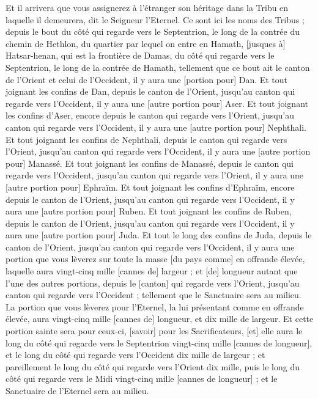 \begin{multicols}{2}
Et il arrivera que vous assignerez à l'étranger son héritage dans la Tribu en laquelle il demeurera, dit le Seigneur l'Eternel.
\VerseOne{}Ce sont ici les noms des Tribus ; depuis le bout du côté qui regarde vers le Septentrion, le long de la contrée du chemin de Hethlon, du quartier par lequel on entre en Hamath, [jusques à] Hatsar-henan, qui est la frontière de Damas, du côté qui regarde vers le Septentrion, le long de la contrée de Hamath, tellement que ce bout ait le canton de l'Orient et celui de l'Occident, il y aura une [portion pour] Dan.
Et tout joignant les confins de Dan, depuis le canton de l'Orient, jusqu'au canton qui regarde vers l'Occident, il y aura une [autre portion pour] Aser.
Et tout joignant les confins d'Aser, encore depuis le canton qui regarde vers l'Orient, jusqu'au canton qui regarde vers l'Occident, il y aura une [autre portion pour] Nephthali.
Et tout joignant les confins de Nephthali, depuis le canton qui regarde vers l'Orient, jusqu'au canton qui regarde vers l'Occident, il y aura une [autre portion pour] Manassé.
Et tout joignant les confins de Manassé, depuis le canton qui regarde vers l'Occident, jusqu'au canton qui regarde vers l'Orient, il y aura une [autre portion pour] Ephraïm.
Et tout joignant les confins d'Ephraïm, encore depuis le canton de l'Orient, jusqu'au canton qui regarde vers l'Occident, il y aura une [autre portion pour] Ruben.
Et tout joignant les confins de Ruben, depuis le canton de l'Orient, jusqu'au canton qui regarde vers l'Occident, il y aura une [autre portion pour] Juda.
Et tout le long des confins de Juda, depuis le canton de l'Orient, jusqu'au canton qui regarde vers l'Occident, il y aura une portion que vous lèverez sur toute la masse [du pays comme] en offrande élevée, laquelle aura vingt-cinq mille [cannes de] largeur ; et [de] longueur autant que l'une des autres portions, depuis le [canton] qui regarde vers l'Orient, jusqu'au canton qui regarde vers l'Occident ; tellement que le Sanctuaire sera au milieu.
La portion que vous lèverez pour l'Eternel, la lui présentant comme en offrande élevée, aura vingt-cinq mille [cannes de] longueur, et dix mille de largeur.
Et cette portion sainte sera pour ceux-ci, [savoir] pour les Sacrificateurs, [et] elle aura le long du côté qui regarde vers le Septentrion vingt-cinq mille [cannes de longueur], et le long du côté qui regarde vers l'Occident dix mille de largeur ; et pareillement le long du côté qui regarde vers l'Orient dix mille, puis le long du côté qui regarde vers le Midi vingt-cinq mille [cannes de longueur] ; et le Sanctuaire de l'Eternel sera au milieu.

\end{multicols}
